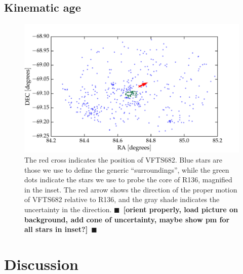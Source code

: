 \documentclass{aa}
\newcommand{\todo}[1]{{\large $\blacksquare$~\textbf{\color{red}[#1]}}~$\blacksquare$}
\newcommand{\kms}{{\,\mathrm{km\ s^{-1}}}}
\begin{document}


\subsection{Kinematic age}


\begin{figure}[htbp]
  \centering
  \includegraphics[width=\textwidth]{./figures/main_plot}  
  \caption{The red cross indicates the position of VFTS682. Blue stars
    are those we use to define the generic ``surroundings'', while the
    green dots indicate the stars we use to probe the core of R136,
    magnified in the inset. The red arrow shows the direction of the
    proper motion of VFTS682 relative to R136, and the gray shade
    indicates the uncertainty in the direction. \todo{orient properly, load  picture on background, add cone
      of uncertainty, maybe show pm for all stars in inset?}}
  \label{fig:main}
\end{figure}

\section{Discussion}
\label{sec:discussion}
\end{document}
